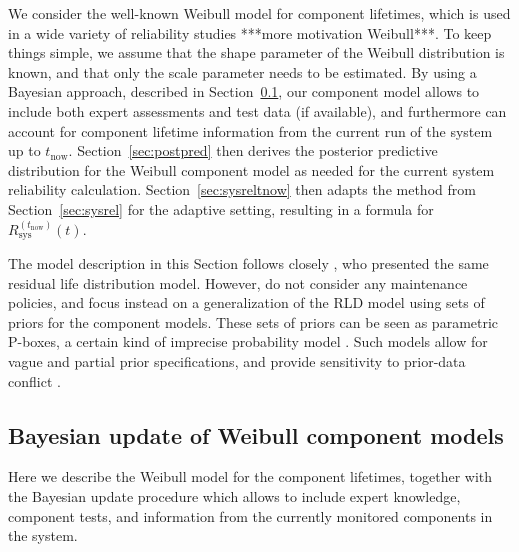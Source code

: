 \documentclass[authoryear]{elsarticle}
\def\tnow{t_\text{now}}
\newcommand{\Rsysnow}{R^{(t_\text{now})}_\text{sys}}
\begin{document}
We consider the well-known Weibull model for component lifetimes,
which is used in a wide variety of reliability studies ***more motivation Weibull***. 
To keep things simple, we assume that the shape parameter of the Weibull distribution is known,
and that only the scale parameter needs to be estimated.
By using a Bayesian approach, described in Section~\ref{sec:weibull},
our component model allows to include both expert assessments and test data (if available),
and furthermore can account for component lifetime information from the current run of the system up to $\tnow$.
%
Section~\ref{sec:postpred} then derives the posterior predictive distribution
for the Weibull component model as needed for the current system reliability calculation.
Section~\ref{sec:sysreltnow} then adapts the method from Section~\ref{sec:sysrel} for the adaptive setting,
resulting in a formula for $\Rsysnow(t)$.

The model description in this Section follows closely \cite{2016:walter-coolen},
who presented the same residual life distribution model.
However, \cite{2016:walter-coolen} do not consider any maintenance policies,
and focus instead on a generalization of the RLD model using sets of priors for the component models.
These sets of priors can be seen as parametric P-boxes,
a certain kind of imprecise probability model \citep[see, e.g.,][]{itip}.
Such models allow for vague and partial prior specifications,
and provide sensitivity to prior-data conflict \cite[\S 2.2.3.3]{diss}.


\subsection{Bayesian update of Weibull component models}
\label{sec:weibull}

Here we describe the Weibull model for the component lifetimes,
together with the Bayesian update procedure which allows to include
expert knowledge, component tests, and information from the currently monitored components in the system.
\end{document}
